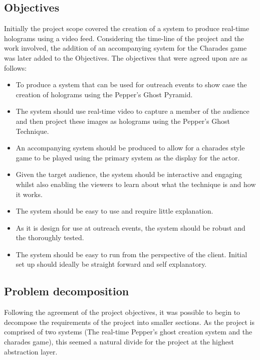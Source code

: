 \subsection{Objectives}
Initially the project scope covered the creation of a system to produce real-time holograms using a video feed. Considering the time-line of the project and the work involved, the addition of an accompanying system for the Charades game was later added to the Objectives.
The objectives that were agreed upon are as follows:
\begin{itemize}
	\item To produce a system that can be used for outreach events to show case the creation of holograms using the Pepper's Ghost Pyramid.
	
	\item The system should use real-time video to capture a member of the audience and then project these images as holograms using the Pepper's Ghost Technique.
	
	\item An accompanying system should be produced to allow for a charades style game to be played using the primary system as the display for the actor.
	
	\item Given the target audience, the system should be interactive and engaging whilst also enabling the viewers to learn about what the technique is and how it works.
	
	\item The system should be easy to use and require little explanation.
	
	\item As it is design for use at outreach events, the system should be robust and the thoroughly tested.
	
	\item The system should be easy to run from the perspective of the client. Initial set up should ideally be straight forward and self explanatory.
\end{itemize}


\subsection{Problem decomposition}
Following the agreement of the project objectives, it was possible to begin to decompose the requirements of the project into smaller sections. As the project is comprised of two systems (The real-time Pepper's ghost creation system and the charades game), this seemed a natural divide for the project at the highest abstraction layer.

